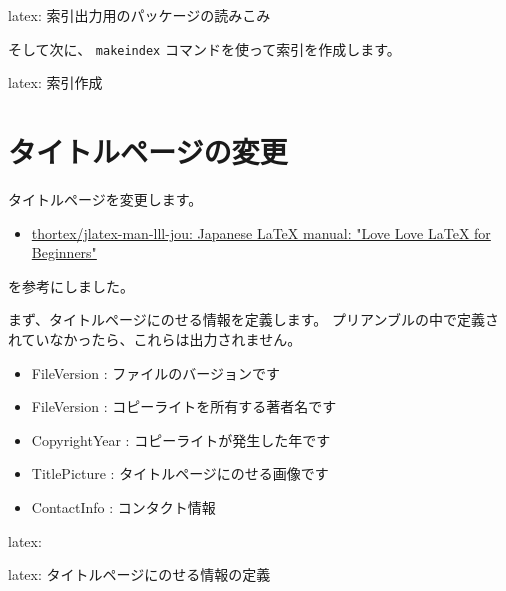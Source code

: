 \documentclass[dvipdfmx,a4j,14pt,uplatex,openany]{jsbook}
\begin{document}
\begin{programlist}[label={org1efb57e}]{latex}{: 索引出力用のパッケージの読みこみ}\usepackage{makeidx}
\end{programlist}

そして次に、 \texttt{makeindex} コマンドを使って索引を作成します。

\begin{programlist}[label={org7476924}]{latex}{: 索引作成}\makeindex
\end{programlist}


\section{タイトルページの変更}
\label{sec:org90d55c1}
タイトルページを変更します。

\begin{itemize}
\item \href{https://github.com/thortex/jlatex-man-lll-jou}{thortex/jlatex-man-lll-jou: Japanese \LaTeX{} manual: "Love Love \LaTeX{} for Beginners"}
\end{itemize}

を参考にしました。

まず、タイトルページにのせる情報を定義します。
プリアンブルの中で定義されていなかったら、これらは出力されません。

\begin{itemize}
\item FileVersion : ファイルのバージョンです
\item FileVersion : コピーライトを所有する著者名です
\item CopyrightYear : コピーライトが発生した年です
\item TitlePicture : タイトルページにのせる画像です
\item ContactInfo : コンタクト情報
\end{itemize}



\begin{programlist}[label={nil}]{latex}{: }
\end{programlist}




\begin{programlist}[label={org8967e71}]{latex}{: タイトルページにのせる情報の定義}%
\global\let\@FileVersion\@empty
\def\FileVersion#1{\gdef\@FileVersion{#1}}

\global\let\@CopyrightAuthor\@empty
\def\CopyrightAuthor#1{\gdef\@CopyrightAuthor{#1}}

\global\let\@CopyrightYear\@empty
\def\CopyrightYear#1{\gdef\@CopyrightYear{#1}}

\global\let\@TitlePicture\@empty
\def\TitlePicture#1{\gdef\@TitlePicture{#1}}

\global\let\@ContactInfo\@empty
\def\ContactInfo#1{\gdef\@contact{#1}}
\end{programlist}
\end{document}
